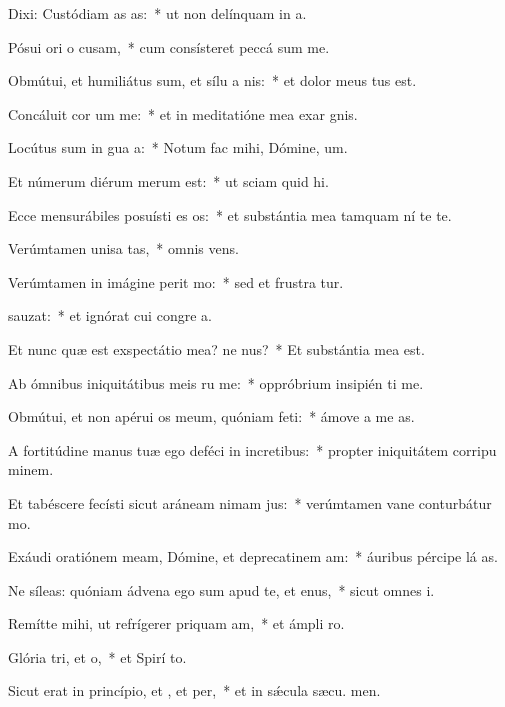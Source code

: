 \item Dixi: Custódiam as as:~* ut non delínquam in  a.
\item Pósui ori o cusam,~* cum consísteret peccá sum me.
\item Obmútui, et humiliátus sum, et sílu a nis:~* et dolor meus tus est.
\item Concáluit cor um  me:~* et in meditatióne mea exar gnis.
\item Locútus sum in gua a:~* Notum fac mihi, Dómine,  um.
\item Et númerum diérum merum  est:~* ut sciam quid  hi.
\item Ecce mensurábiles posuísti es os:~* et substántia mea tamquam ní te te.
\item Verúmtamen unisa tas,~* omnis  vens.
\item Verúmtamen in imágine perit mo:~* sed et frustra tur.
\item {}sauzat:~* et ignórat cui congre a.
\item Et nunc quæ est exspectátio mea? ne nus?~* Et substántia mea   est.
\item Ab ómnibus iniquitátibus meis ru me:~* oppróbrium insipién ti me.
\item Obmútui, et non apérui os meum, quóniam  feti:~* ámove a me  as.
\item A fortitúdine manus tuæ ego deféci in incretibus:~* propter iniquitátem corripu minem.
\item Et tabéscere fecísti sicut aráneam nimam jus:~* verúmtamen vane conturbátur  mo.
\item Exáudi oratiónem meam, Dómine, et deprecatinem am:~* áuribus pércipe lá as.
\item Ne síleas: quóniam ádvena ego sum apud te, et enus,~* sicut omnes  i.
\item Remítte mihi, ut refrígerer priquam am,~* et ámpli  ro.
\item Glória tri, et o,~* et Spirí to.
\item Sicut erat in princípio, et , et per,~* et in sǽcula sæcu. men.
